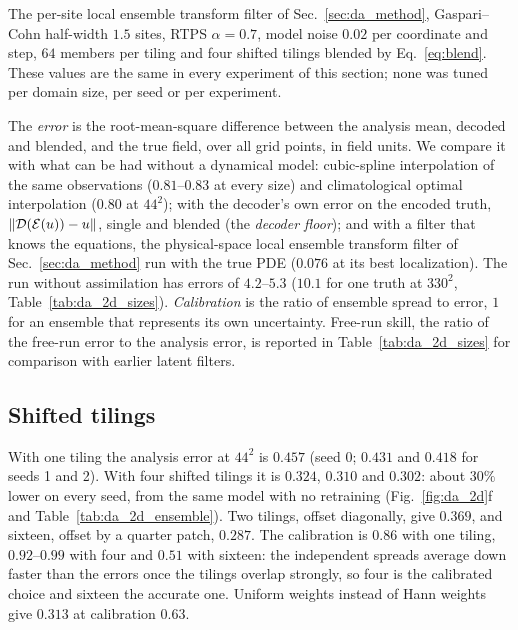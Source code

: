  The per-site local ensemble transform filter of
Sec.~\ref{sec:da_method}, Gaspari--Cohn half-width $1.5$ sites, RTPS
$\alpha=0.7$, model noise $0.02$ per coordinate and step, $64$ members per
tiling and four shifted tilings blended by Eq.~\eqref{eq:blend}. These
values are the same in every experiment of this section; none was tuned
per domain size, per seed or per experiment.

 The \emph{error} is the root-mean-square
difference between the analysis mean, decoded and blended, and the true
field, over all grid points, in field units. We compare it with what can
be had without a dynamical model: cubic-spline interpolation of the same
observations ($0.81$--$0.83$ at every size) and climatological optimal
interpolation ($0.80$ at $44^2$); with the decoder's own error on the
encoded truth, $\|\mathcal{D}(\mathcal{E}(u))-u\|$, single and blended (the \emph{decoder
floor}); and with a filter that knows the equations, the physical-space
local ensemble transform filter of Sec.~\ref{sec:da_method} run with the
true PDE ($0.076$ at its best localization). The run without assimilation
has errors of $4.2$--$5.3$ ($10.1$ for one truth at $330^2$, Table~\ref{tab:da_2d_sizes}). \emph{Calibration} is the ratio of ensemble
spread to error, $1$ for an ensemble that represents its own
uncertainty. Free-run skill, the ratio of the free-run error to the
analysis error, is reported in Table~\ref{tab:da_2d_sizes} for comparison
with earlier latent filters.

\subsection{Shifted tilings}
\label{sec:da_tilings}

With one tiling the analysis error at $44^2$ is $0.457$ (seed 0; $0.431$ and
$0.418$ for seeds 1 and 2). With four shifted tilings it is $0.324$, $0.310$
and $0.302$: about $30\%$ lower on every seed, from the same model with no
retraining (Fig.~\ref{fig:da_2d}f and Table~\ref{tab:da_2d_ensemble}). Two
tilings, offset diagonally, give $0.369$, and sixteen, offset by a quarter
patch, $0.287$. The calibration is $0.86$ with one tiling, $0.92$--$0.99$ with
four and $0.51$ with sixteen: the independent spreads average down faster
than the errors once the tilings overlap strongly, so four is the
calibrated choice and sixteen the accurate one. Uniform weights instead
of Hann weights give $0.313$ at calibration $0.63$.


